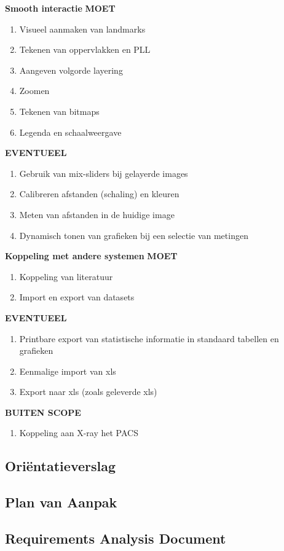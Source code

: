 \Large{\textbf{Smooth interactie}}
\large{\textbf{MOET}}
\begin{enumerate}
	\item Visueel aanmaken van landmarks
	\item Tekenen van oppervlakken en PLL
	\item Aangeven volgorde layering
	\item Zoomen
	\item Tekenen van bitmaps
	\item Legenda en schaalweergave
\end{enumerate}
\large{\textbf{EVENTUEEL}}
\begin{enumerate}
	\item Gebruik van mix-sliders bij gelayerde images
	\item Calibreren afstanden (schaling) en kleuren
	\item Meten van afstanden in de huidige image
	\item Dynamisch tonen van grafieken bij een selectie van metingen
\end{enumerate}

\Large{\textbf{Koppeling met andere systemen}}
\large{\textbf{MOET}}
\begin{enumerate}
	\item Koppeling van literatuur
	\item Import en export van datasets
\end{enumerate}
\large{\textbf{EVENTUEEL}}
\begin{enumerate}
	\item Printbare export van statistische informatie in standaard tabellen en grafieken
	\item Eenmalige import van xls
	\item Export naar xls (zoals geleverde xls)
\end{enumerate}
\large{\textbf{BUITEN SCOPE}}
\begin{enumerate}
	\item Koppeling aan X-ray het PACS
\end{enumerate}

\subsection{Ori\"{e}ntatieverslag}

\subsection{Plan van Aanpak}

\subsection{Requirements Analysis Document}
